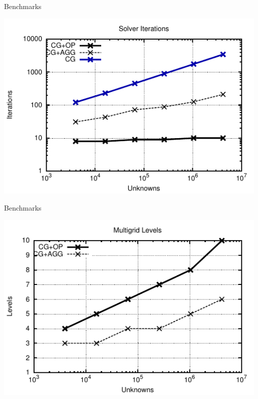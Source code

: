 \begin{frame}{Benchmarks}
  \begin{center}
   \includegraphics[width=0.99\textwidth]{figures/iters.pdf}
  \end{center}
\end{frame}


\begin{frame}{Benchmarks}
  \begin{center}
   \includegraphics[width=0.99\textwidth]{figures/levels.pdf}
  \end{center}
\end{frame}


